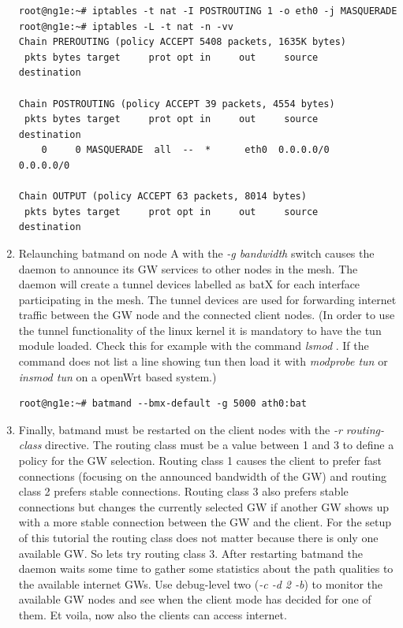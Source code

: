 \documentclass[11pt]{article}
\begin{document}
\begin{enumerate}
\begin{small} \begin{verbatim}
root@ng1e:~# iptables -t nat -I POSTROUTING 1 -o eth0 -j MASQUERADE
root@ng1e:~# iptables -L -t nat -n -vv
Chain PREROUTING (policy ACCEPT 5408 packets, 1635K bytes)
 pkts bytes target     prot opt in     out     source               destination

Chain POSTROUTING (policy ACCEPT 39 packets, 4554 bytes)
 pkts bytes target     prot opt in     out     source               destination
    0     0 MASQUERADE  all  --  *      eth0  0.0.0.0/0            0.0.0.0/0

Chain OUTPUT (policy ACCEPT 63 packets, 8014 bytes)
 pkts bytes target     prot opt in     out     source               destination
\end{verbatim} \end{small}

\item Relaunching batmand on node A with the \emph{-g bandwidth } switch causes the daemon to announce its GW services to other nodes in the mesh. The daemon will create a tunnel devices labelled as batX for each interface participating in the mesh. The tunnel devices are used for forwarding internet traffic between the GW node and the connected client nodes. (In order to use the tunnel functionality of the linux kernel it is mandatory to have the tun module loaded. Check this for example with the command \emph{lsmod }. If the command does not list a line showing tun then load it with \emph{modprobe tun} or \emph{insmod tun} on a openWrt based system.)


\begin{small} \begin{verbatim}
root@ng1e:~# batmand --bmx-default -g 5000 ath0:bat
\end{verbatim} \end{small}


\item Finally, batmand must be restarted on the client nodes with the \emph{-r routing-class} directive.
The routing class must be a value between 1 and 3 to define a policy for the GW selection.
Routing class 1 causes the client to prefer fast connections (focusing on the announced bandwidth of the GW) and routing class 2 prefers stable connections.
Routing class 3 also prefers stable connections but changes the currently selected GW if another GW shows up with a more stable connection between the GW and the client.
For the setup of this tutorial the routing class does not matter because there is only one available GW. So lets try routing class 3.
After restarting batmand the daemon waits some time to gather some statistics about the path qualities to the available internet GWs. Use debug-level two (\emph{-c -d 2 -b}) to monitor the available GW nodes and see when the client mode has decided for one of them.
Et voila, now also the clients can access internet.


\end{enumerate}
\end{document}
